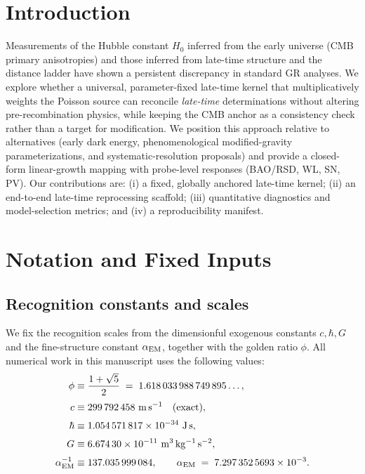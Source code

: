 \documentclass[11pt]{article}
\begin{document}
\section{Introduction}
Measurements of the Hubble constant $H_0$ inferred from the early universe (CMB primary anisotropies) and those inferred from late-time structure and the distance ladder have shown a persistent discrepancy in standard GR analyses. We explore whether a universal, parameter-fixed late-time kernel that multiplicatively weights the Poisson source can reconcile \emph{late-time} determinations without altering pre-recombination physics, while keeping the CMB anchor as a consistency check rather than a target for modification. We position this approach relative to alternatives (early dark energy, phenomenological modified-gravity parameterizations, and systematic-resolution proposals) and provide a closed-form linear-growth mapping with probe-level responses (BAO/RSD, WL, SN, PV). Our contributions are: (i) a fixed, globally anchored late-time kernel; (ii) an end-to-end late-time reprocessing scaffold; (iii) quantitative diagnostics and model-selection metrics; and (iv) a reproducibility manifest.

\section{Notation and Fixed Inputs}

\subsection*{Recognition constants and scales}

We fix the recognition scales from the dimensionful exogenous constants \(c,\hbar,G\) and the fine-structure constant \(\alpha_{\rm EM}\), together with the golden ratio \(\phi\).
All numerical work in this manuscript uses the following values:
\begin{align*}
\phi &\equiv \frac{1+\sqrt{5}}{2} \;=\; 1.618\,033\,988\,749\,895\ldots,\\[0.25em]
c &\equiv 299\,792\,458~\mathrm{m\,s^{-1}} \quad\text{(exact)},\\[0.25em]
\hbar &\equiv 1.054\,571\,817\times 10^{-34}~\mathrm{J\,s},\\[0.25em]
G &\equiv 6.674\,30\times 10^{-11}~\mathrm{m^{3}\,kg^{-1}\,s^{-2}},\\[0.25em]
\alpha_{\rm EM}^{-1} &\equiv 137.035\,999\,084, \qquad
\alpha_{\rm EM} \;=\; 7.297\,352\,5693\times 10^{-3}.
\end{align*}
\end{document}
